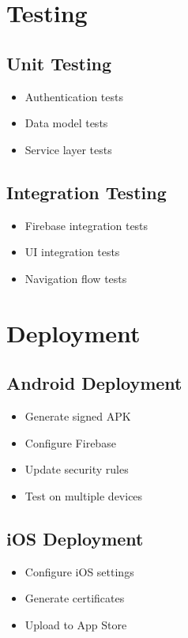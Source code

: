 \documentclass[12pt,a4paper]{article}
\begin{document}
\section{Testing}
\subsection{Unit Testing}
\begin{itemize}
    \item Authentication tests
    \item Data model tests
    \item Service layer tests
\end{itemize}

\subsection{Integration Testing}
\begin{itemize}
    \item Firebase integration tests
    \item UI integration tests
    \item Navigation flow tests
\end{itemize}

\section{Deployment}
\subsection{Android Deployment}
\begin{itemize}
    \item Generate signed APK
    \item Configure Firebase
    \item Update security rules
    \item Test on multiple devices
\end{itemize}

\subsection{iOS Deployment}
\begin{itemize}
    \item Configure iOS settings
    \item Generate certificates
    \item Upload to App Store
\end{itemize}
\end{document}
